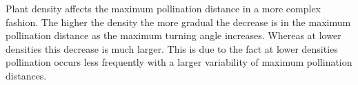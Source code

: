 

Plant density affects the maximum pollination distance in a more complex fashion.  The higher the
density the more gradual the decrease is in the maximum pollination distance as the maximum turning
angle increases.  Whereas at lower densities this decrease is much larger.  This is due to
the fact at lower densities pollination occurs less frequently with a larger variability of
maximum pollination distances.

